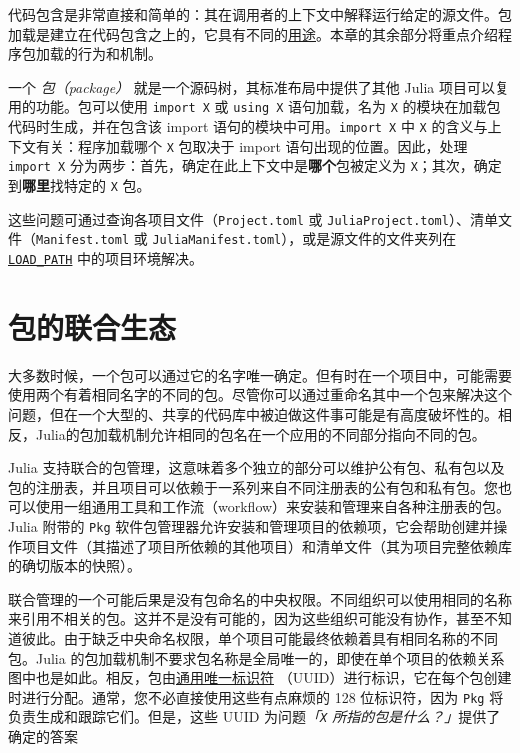 代码包含是非常直接和简单的：其在调用者的上下文中解释运行给定的源文件。包加载是建立在代码包含之上的，它具有不同的\hyperlink{16725527896995457152}{用途}。本章的其余部分将重点介绍程序包加载的行为和机制。



一个 \emph{包（package）} 就是一个源码树，其标准布局中提供了其他 Julia 项目可以复用的功能。包可以使用 \texttt{import X} 或 \texttt{using X} 语句加载，名为 \texttt{X} 的模块在加载包代码时生成，并在包含该 import 语句的模块中可用。\texttt{import X} 中 \texttt{X} 的含义与上下文有关：程序加载哪个 \texttt{X} 包取决于 import 语句出现的位置。因此，处理 \texttt{import X} 分为两步：首先，确定在此上下文中是\textbf{哪个}包被定义为 \texttt{X}；其次，确定到\textbf{哪里}找特定的 \texttt{X} 包。



这些问题可通过查询各项目文件（\texttt{Project.toml} 或 \texttt{JuliaProject.toml}）、清单文件（\texttt{Manifest.toml} 或 \texttt{JuliaManifest.toml}），或是源文件的文件夹列在\hyperlink{17914149694871263675}{\texttt{LOAD\_PATH}} 中的项目环境解决。



\hypertarget{7954410959763991520}{}


\section{包的联合生态}



大多数时候，一个包可以通过它的名字唯一确定。但有时在一个项目中，可能需要使用两个有着相同名字的不同的包。尽管你可以通过重命名其中一个包来解决这个问题，但在一个大型的、共享的代码库中被迫做这件事可能是有高度破坏性的。相反，Julia的包加载机制允许相同的包名在一个应用的不同部分指向不同的包。



Julia 支持联合的包管理，这意味着多个独立的部分可以维护公有包、私有包以及包的注册表，并且项目可以依赖于一系列来自不同注册表的公有包和私有包。您也可以使用一组通用工具和工作流（workflow）来安装和管理来自各种注册表的包。Julia 附带的 \texttt{Pkg} 软件包管理器允许安装和管理项目的依赖项，它会帮助创建并操作项目文件（其描述了项目所依赖的其他项目）和清单文件（其为项目完整依赖库的确切版本的快照）。



联合管理的一个可能后果是没有包命名的中央权限。不同组织可以使用相同的名称来引用不相关的包。这并不是没有可能的，因为这些组织可能没有协作，甚至不知道彼此。由于缺乏中央命名权限，单个项目可能最终依赖着具有相同名称的不同包。Julia 的包加载机制不要求包名称是全局唯一的，即使在单个项目的依赖关系图中也是如此。相反，包由\href{https://en.wikipedia.org/wiki/Universally\_unique\_identifier}{通用唯一标识符} （UUID）进行标识，它在每个包创建时进行分配。通常，您不必直接使用这些有点麻烦的 128 位标识符，因为 \texttt{Pkg} 将负责生成和跟踪它们。但是，这些 UUID 为问题\emph{「\texttt{X} 所指的包是什么？」}提供了确定的答案



